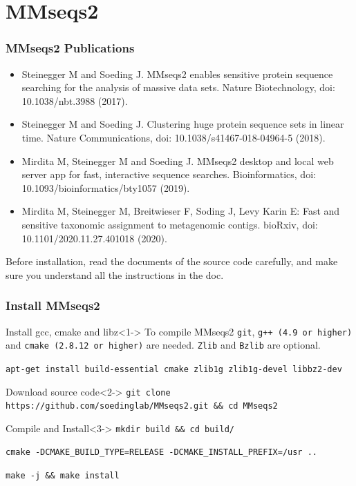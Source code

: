 \documentclass[UTF8]{beamer}
\begin{document}
	\section{MMseqs2}

	\begin{frame}
	    \frametitle{MMseqs2 Publications}
		\begin{itemize}
			\item Steinegger M and Soeding J. MMseqs2 enables sensitive protein sequence searching for the analysis of massive data sets. Nature Biotechnology, doi: 10.1038/nbt.3988 (2017).
			\item Steinegger M and Soeding J. Clustering huge protein sequence sets in linear time. Nature Communications, doi: 10.1038/s41467-018-04964-5 (2018).
			\item Mirdita M, Steinegger M and Soeding J. MMseqs2 desktop and local web server app for fast, interactive sequence searches. Bioinformatics, doi: 10.1093/bioinformatics/bty1057 (2019).
			\item Mirdita M, Steinegger M, Breitwieser F, Soding J, Levy Karin E: Fast and sensitive taxonomic assignment to metagenomic contigs. bioRxiv, doi: 10.1101/2020.11.27.401018 (2020).
		\end{itemize}
    \end{frame}
	
	\begin{frame}[fragile]
		Before installation, \alert{read the documents of the source code carefully}, 
		and make sure you understand all the instructions in the doc.
	    \frametitle{Install MMseqs2}
		\begin{block}{Install gcc, cmake and libz}<1->
			To compile MMseqs2 \alert{\lstinline{git}, \lstinline{g++ (4.9 or higher)} and \lstinline{cmake (2.8.12 or higher)}} are needed.
			\lstinline{Zlib} and \lstinline{Bzlib} are optional.

			\lstinline{apt-get install build-essential cmake zlib1g zlib1g-devel libbz2-dev}
		\end{block}
		\begin{block}{Download source code}<2->
			\lstinline{git clone https://github.com/soedinglab/MMseqs2.git && cd MMseqs2}
		\end{block}
		\begin{block}{Compile and Install}<3->
			\lstinline{mkdir build && cd build/}

			\lstinline{cmake -DCMAKE_BUILD_TYPE=RELEASE -DCMAKE_INSTALL_PREFIX=/usr ..}

			\lstinline{make -j && make install}
		\end{block}

    \end{frame}
\end{document}
